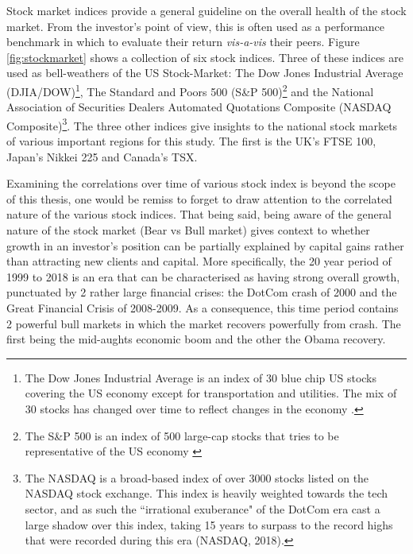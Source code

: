 Stock market indices provide a general guideline on the overall health of the stock market\citep{Lo21}.  From the investor's point of view, this is often used as a performance benchmark in which to evaluate their return \textit{vis-a-vis} their peers. Figure \ref{fig:stockmarket} shows a collection of six stock indices.  Three of these indices are used as bell-weathers of the US Stock-Market: The Dow Jones Industrial Average (DJIA/DOW)\footnote{The Dow Jones Industrial Average is an index of 30 blue chip US stocks covering the US economy except for transportation and utilities.  The mix of 30 stocks has changed over time to reflect changes in the economy \citep{DOW2020}.}, The Standard and Poors 500 (S\&P 500)\footnote{The S\&P 500 is an index of 500 large-cap stocks that tries to be representative of the US economy \citep{SNP2020}} and the National Association of Securities Dealers Automated Quotations Composite (NASDAQ Composite)\footnote{The NASDAQ is a broad-based index of over 3000 stocks listed on the NASDAQ stock exchange.  This index is heavily weighted towards the tech sector, and as such the ``irrational exuberance" of the DotCom era cast a large shadow over this index, taking 15 years to surpass to the record highs that were recorded during this era (NASDAQ, 2018)\nocite{NASDAQ2018}.}.   The three other indices give insights to the national stock markets of various important regions for this study.  The first is the UK's FTSE 100, Japan's Nikkei 225 and Canada's TSX.  

Examining the correlations over time of various stock index is beyond the scope of this thesis, one would be remiss to forget to draw attention to the correlated nature of the various stock indices.  That being said, being aware of the general nature of the stock market (Bear vs Bull market) gives context to whether growth in an investor's position can be partially explained by capital gains rather than attracting new clients and capital.  More specifically, the 20 year period of 1999 to 2018 is an era that can be characterised as having strong overall growth, punctuated by 2 rather large financial crises: the DotCom crash of 2000 and the Great Financial Crisis of 2008-2009.  As a consequence, this time period contains 2 powerful bull markets in which the market recovers powerfully from crash.  The first being the mid-aughts economic boom and the other the Obama recovery.




